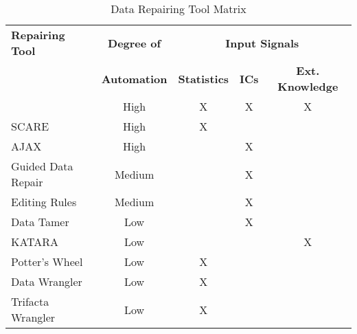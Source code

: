 
\begin{table*}
    \caption{Data Repairing Tool Matrix}
    \label{tab:tools}
    \newcommand{\h}{High}
    \newcommand{\m}{Medium}
    \newcommand{\lo}{Low}
    \begin{tabular}{lcccc}
    \toprule
    	\textbf{Repairing Tool}                    & \textbf{Degree of}  &          \multicolumn{3}{c}{\textbf{Input Signals}}          \\
    	                                           & \textbf{Automation} & \textbf{Statistics} & \textbf{ICs} & \textbf{Ext. Knowledge} \\
    \midrule
    	\holoclean{} \cite{holoclean}              &         \h          &          X          &      X       &            X            \\
    	SCARE \cite{scare}                         &         \h          &          X          &              &  \\
    	AJAX \cite{ajax}                           &         \h          &                     &      X       &  \\
    	Guided Data Repair \cite{gdr}              &         \m          &                     &      X       &  \\
    	Editing Rules \cite{editing_rules}         &         \m          &                     &      X       &  \\
    	Data Tamer \cite{data_tamer}               &         \lo         &                     &      X       &  \\
    	KATARA \cite{katara}                       &         \lo         &                     &              &            X            \\
    	Potter's Wheel \cite{potters_wheel}        &         \lo         &          X          &              &  \\
    	Data Wrangler \cite{data_wrangler}         &         \lo         &          X          &              &  \\
    	Trifacta Wrangler \cite{trifacta_wrangler} &         \lo         &          X          &              &  \\
    \bottomrule
    \end{tabular}
  \end{table*}